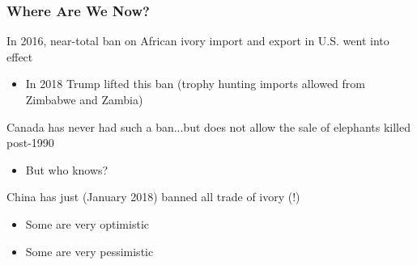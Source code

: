 \documentclass[10pt]{beamer}
\begin{document}
\begin{frame}[t]
\frametitle{Where Are We Now?}
\vspace{0.5cm}
	
	In 2016, near-total ban on African ivory import and export in U.S. went into effect
		\smallskip
		\begin{itemize}
			\item In 2018 Trump lifted this ban (trophy hunting imports allowed from Zimbabwe and Zambia)\\
		\end{itemize}
	
	\vspace{0.5cm}
	
	Canada has never had such a ban...but does not allow the sale of elephants killed post-1990\\
		\smallskip
		\begin{itemize}
			\item But who knows?\\
		\end{itemize}
	
	\vspace{0.5cm}
	
	China has just (January 2018) banned all trade of ivory (!)
		\smallskip
		\begin{itemize}
			\item Some are very optimistic
			\smallskip
			\item Some are very pessimistic
		\end{itemize}	
\end{frame}
\end{document}
